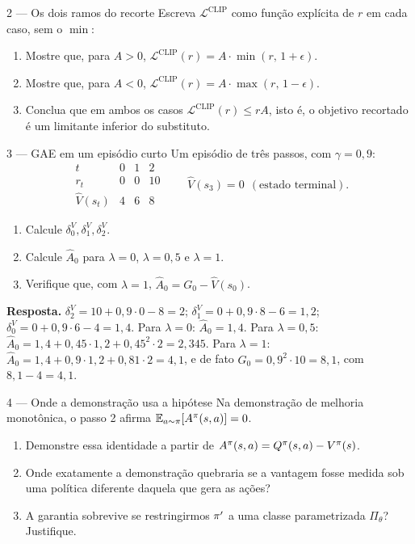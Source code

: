 \documentclass[11pt]{article}
\newcommand{\thv}{\theta}
\newcommand{\polnovo}{\pol'}
\newcommand{\Vhat}{\hat{V}}
\newcommand{\Ahat}{\hat{A}}
\newcommand{\Adv}{A}
\newcommand{\Advpi}{A^{\pol}}
\newcommand{\Lclip}{\mathcal{L}^{\mathrm{CLIP}}}
\begin{document}
\begin{exbox}{2 --- Os dois ramos do recorte}
  Escreva $\Lclip$ como função explícita de $r$ em cada caso, sem o $\min$:
  \begin{enumerate}
    \item Mostre que, para $\Adv > 0$, $\Lclip(r) = \Adv\cdot\min(r,\,1+\epsilon)$.
    \item Mostre que, para $\Adv < 0$, $\Lclip(r) = \Adv\cdot\max(r,\,1-\epsilon)$.
    \item Conclua que em ambos os casos $\Lclip(r) \le r\Adv$, isto é, o objetivo
      recortado é um limitante inferior do substituto.
  \end{enumerate}
\end{exbox}

\begin{exbox}{3 --- GAE em um episódio curto}
  Um episódio de três passos, com $\gamma = 0{,}9$:
  \[
    \begin{array}{c|ccc}
      t & 0 & 1 & 2\\\hline
      r_t & 0 & 0 & 10\\
      \Vhat(s_t) & 4 & 6 & 8
    \end{array}
    \qquad \Vhat(s_3) = 0 \ \ (\text{estado terminal}).
  \]
  \begin{enumerate}
    \item Calcule $\delta^V_0,\delta^V_1,\delta^V_2$.
    \item Calcule $\Ahat_0$ para $\lambda = 0$, $\lambda = 0{,}5$ e $\lambda = 1$.
    \item Verifique que, com $\lambda=1$, $\Ahat_0 = G_0 - \Vhat(s_0)$.
  \end{enumerate}
  \textbf{Resposta.} $\delta^V_2 = 10 + 0{,}9\cdot0 - 8 = 2$;
  $\delta^V_1 = 0 + 0{,}9\cdot8 - 6 = 1{,}2$;
  $\delta^V_0 = 0 + 0{,}9\cdot6 - 4 = 1{,}4$.
  Para $\lambda=0$: $\Ahat_0 = 1{,}4$.
  Para $\lambda=0{,}5$: $\Ahat_0 = 1{,}4 + 0{,}45\cdot1{,}2 + 0{,}45^2\cdot2 = 2{,}345$.
  Para $\lambda=1$: $\Ahat_0 = 1{,}4 + 0{,}9\cdot1{,}2 + 0{,}81\cdot2 = 4{,}1$, e de fato
  $G_0 = 0{,}9^2\cdot10 = 8{,}1$, com $8{,}1 - 4 = 4{,}1$.
\end{exbox}

\begin{exbox}{4 --- Onde a demonstração usa a hipótese}
  Na demonstração de melhoria monotônica, o passo 2 afirma
  $\E_{a\sim\pol}[\Advpi(s,a)] = 0$.
  \begin{enumerate}
    \item Demonstre essa identidade a partir de $\Advpi(s,a) = \Qpi(s,a) - \Vpi(s)$.
    \item Onde exatamente a demonstração quebraria se a vantagem fosse medida sob uma
      política diferente daquela que gera as ações?
    \item A garantia sobrevive se restringirmos $\polnovo$ a uma classe parametrizada
      $\Pi_\thv$? Justifique.
  \end{enumerate}
\end{exbox}
\end{document}
